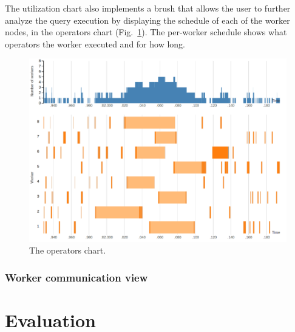 \documentclass{chi2009}
\begin{document}
The utilization chart also implements a brush that allows the user to further
analyze the query execution by displaying the schedule of each of the worker
nodes, in the operators chart (Fig.~\ref{fig:operators_chart}). The per-worker
schedule shows what operators the worker executed and for how long.


\begin{figure}[ht]
  \includegraphics[width=\columnwidth]{images/operators_chart}
  \caption{The operators chart.}
  \label{fig:operators_chart}
\end{figure}


\subsubsection{Worker communication view}


\section{Evaluation}
\end{document}
